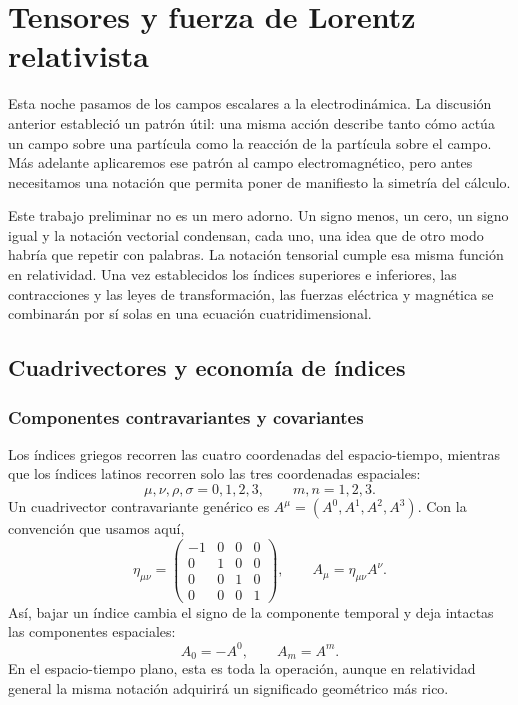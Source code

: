 \chapter{Tensores y fuerza de Lorentz relativista}

Esta noche pasamos de los campos escalares a la electrodinámica. La discusión anterior estableció un patrón útil: una misma acción describe tanto cómo actúa un campo sobre una partícula como la reacción de la partícula sobre el campo. Más adelante aplicaremos ese patrón al campo electromagnético, pero antes necesitamos una notación que permita poner de manifiesto la simetría del cálculo.

Este trabajo preliminar no es un mero adorno. Un signo menos, un cero, un signo igual y la notación vectorial condensan, cada uno, una idea que de otro modo habría que repetir con palabras. La notación tensorial cumple esa misma función en relatividad. Una vez establecidos los índices superiores e inferiores, las contracciones y las leyes de transformación, las fuerzas eléctrica y magnética se combinarán por sí solas en una ecuación cuatridimensional.

\section{Cuadrivectores y economía de índices}

\subsection{Componentes contravariantes y covariantes}

Los índices griegos recorren las cuatro coordenadas del espacio-tiempo, mientras que los índices latinos recorren solo las tres coordenadas espaciales:
\begin{equation}
\mu,\nu,\rho,\sigma=0,1,2,3,
\qquad
m,n=1,2,3.
\end{equation}
Un cuadrivector contravariante genérico es \(A^\mu=(A^0,A^1,A^2,A^3)\).
Con la convención que usamos aquí,
\begin{equation}
\eta_{\mu\nu}
=
\begin{pmatrix}
-1&0&0&0\\
0&1&0&0\\
0&0&1&0\\
0&0&0&1
\end{pmatrix},
\qquad
A_\mu=\eta_{\mu\nu}A^\nu .
\label{eq:sr6-metric-lowering}
\end{equation}
Así, bajar un índice cambia el signo de la componente temporal y deja intactas las componentes espaciales:
\begin{equation}
A_0=-A^0,
\qquad
A_m=A^m.
\label{eq:sr6-component-lowering}
\end{equation}
En el espacio-tiempo plano, esta es toda la operación, aunque en relatividad general la misma notación adquirirá un significado geométrico más rico.

